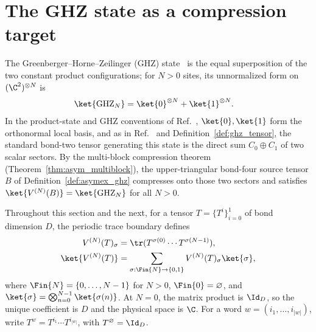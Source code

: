 \section{The GHZ state as a compression target}%
\label{sec:asymex_ghz}

The Greenberger--Horne--Zeilinger (GHZ)
state~\cite{GreenbergerHorneZeilinger1989,Greenberger1990Bell} is the
equal superposition of the two constant product configurations; for
$N>0$ sites, its unnormalized form on $(\C^2)^{\otimes N}$ is
\begin{align}
    \ket{\mathrm{GHZ}_N}
     & =\ket{0}^{\otimes N}+\ket{1}^{\otimes N}.
    \notag
\end{align}
In the product-state and GHZ conventions of
Ref.~\cite[Appendix~A]{Cirac2021Matrix}, $\ket{0},\ket{1}$ form the
orthonormal local basis, and as in
Ref.~\cite[Appendix~A]{Cirac2021Matrix} and
Definition~\ref{def:ghz_tensor}, the standard bond-two tensor generating
this state is the direct sum $C_0\oplus C_1$ of two scalar sectors.
By the multi-block compression theorem
(Theorem~\ref{thm:asym_multiblock}), the upper-triangular bond-four
source tensor $B$ of Definition~\ref{def:asymex_ghz} compresses onto
those two sectors and satisfies
$\ket{V^{(N)}(B)} = \ket{\mathrm{GHZ}_N}$ for all $N>0$.

Throughout this section and the next, for a tensor $T=\{T^i\}_{i=0}^1$
of bond dimension $D$, the periodic trace boundary defines
\begin{align}
    V^{(N)}(T)_\sigma
     & =\tr(T^{\sigma(0)}\cdots T^{\sigma(N-1)}),
    \label{eq:asymex_periodic_amplitude}          \\
    \ket{V^{(N)}(T)}
     & =\sum_{\sigma:\Fin{N}\to\{0,1\}}
    V^{(N)}(T)_\sigma\ket{\sigma},
    \notag
\end{align}
where $\Fin{N}=\{0,\ldots,N-1\}$ for $N>0$, $\Fin{0}=\varnothing$,
and $\ket{\sigma}=\bigotimes_{n=0}^{N-1}\ket{\sigma(n)}$.
At $N=0$, the matrix product is $\Id_D$, so the unique coefficient is
$D$ and the physical space is $\C$.
For a word $w=(i_1,\ldots,i_{|w|})$, write
$T^w=T^{i_1}\cdots T^{i_{|w|}}$, with $T^\varnothing=\Id_D$.

